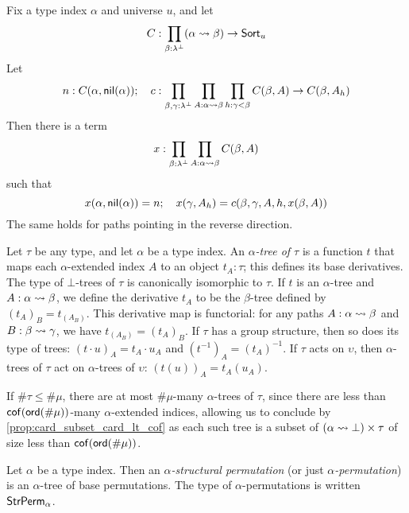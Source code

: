 \begin{proposition}
  \label{prop:Path.rec}
  Fix a type index \( \alpha \) and universe \( u \), and let
  \[ C : \prod_{\beta : \lambda^\bot} (\alpha \rightsquigarrow \beta) \to \mathsf{Sort}_u \]
  Let
  \[ n : C(\alpha, \operatorname{\mathsf{nil}}(\alpha));\quad c : \prod_{\beta, \gamma : \lambda^\bot} \prod_{A : \alpha \rightsquigarrow \beta} \prod_{h : \gamma < \beta} C(\beta, A) \to C(\beta, A_h) \]
  Then there is a term
  \[ x : \prod_{\beta : \lambda^\bot} \prod_{A : \alpha \rightsquigarrow \beta} C(\beta, A) \]
  such that
  \[ x(\alpha, \operatorname{\mathsf{nil}}(\alpha)) = n;\quad x(\gamma, A_h) = c(\beta, \gamma, A, h, x(\beta, A)) \]
  The same holds for paths pointing in the reverse direction.
\end{proposition}
\begin{definition}[tree]
  \label{def:Tree}
  Let \( \tau \) be any type, and let \( \alpha \) be a type index.
  An \emph{\( \alpha \)-tree of \( \tau \)} is a function \( t \) that maps each \( \alpha \)-extended index \( A \) to an object \( t_A : \tau \); this defines its base derivatives.
  The type of \( \bot \)-trees of \( \tau \) is canonically isomorphic to \( \tau \).
  If \( t \) is an \( \alpha \)-tree and \( A : \alpha \rightsquigarrow \beta \), we define the derivative \( t_A \) to be the \( \beta \)-tree defined by \( (t_A)_B = t_{(A_B)} \).
  This derivative map is functorial: for any paths \( A : \alpha \rightsquigarrow \beta \) and \( B : \beta \rightsquigarrow \gamma \), we have \( t_{(A_B)} = (t_A)_B \).
  If \( \tau \) has a group structure, then so does its type of trees: \( (t \cdot u)_A = t_A \cdot u_A \) and \( (t^{-1})_A = (t_A)^{-1} \).
  If \( \tau \) acts on \( \upsilon \), then \( \alpha \)-trees of \( \tau \) act on \( \alpha \)-trees of \( \upsilon \): \( (t(u))_A = t_A(u_A) \).

  If \( \#\tau \leq \#\mu \), there are at most \( \#\mu \)-many \( \alpha \)-trees of \( \tau \), since there are less than \( \operatorname{\mathsf{cof}}(\operatorname{\mathsf{ord}}(\#\mu)) \)-many \( \alpha \)-extended indices, allowing us to conclude by \cref{prop:card_subset_card_lt_cof} as each such tree is a subset of \( (\alpha \rightsquigarrow \bot) \times \tau \) of size less than \( \operatorname{\mathsf{cof}}(\operatorname{\mathsf{ord}}(\#\mu)) \).
\end{definition}
\begin{definition}
  \label{def:StrPerm}
  Let \( \alpha \) be a type index.
  Then an \emph{\( \alpha \)-structural permutation} (or just \emph{\( \alpha \)-permutation}) is an \( \alpha \)-tree of base permutations.
  The type of \( \alpha \)-permutations is written \( \mathsf{StrPerm}_\alpha \).
\end{definition}
